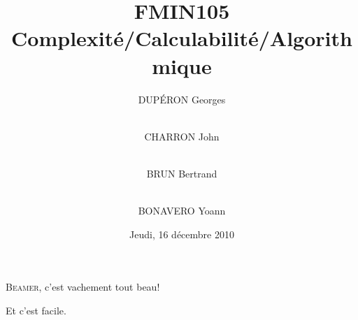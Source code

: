 \documentclass{beamer}
\title{FMIN105 \\ Complexité/Calculabilité/Algorithmique}
\author{DUPÉRON Georges \and\\ CHARRON John \and\\ BRUN Bertrand \and\\ BONAVERO Yoann}
\institute{Université Montpellier II, Département informatique}
\date{Jeudi, 16 décembre 2010}
\begin{document}
\begin{frame}
  \titlepage
\end{frame}

\begin{frame}
  \textsc{Beamer}, c'est vachement tout beau!
\end{frame}

\begin{frame}
  Et c'est facile.
\end{frame}
\end{document}
